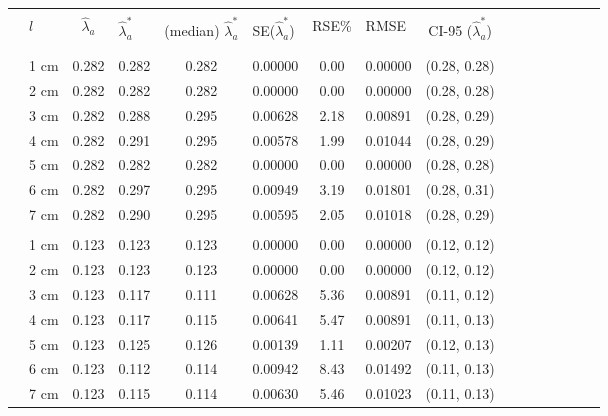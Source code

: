 \documentclass[a4paper 12pt]{article}
\numberwithin{equation}{section}
\begin{document}
\clearpage
 \begin{small}
\begin{table}[h!]
\centering
\setlength\tabcolsep{10.5pt} 
\begin{footnotesize}
\begin{tabular}{clclclclclclclcl}
  \hline \\ [0.3ex]
&  $l$ & $\hat{\lambda}_{a}$  & $\hat{\lambda}_{a}^{*}$ & (median) $\hat{\lambda}_{a}^{*}$  & SE($\hat{\lambda}_{a}^{*}$) & RSE\%& RMSE &  CI-95 ($\hat{\lambda}_{a}^{*}$) \\ [1.0ex]
\hline \\
 \raisebox{1ex}{\bf age 0}  \\ [1.0ex]
&   1 cm & 0.282  &    0.282 &  0.282 &  0.00000 & 0.00 & 0.00000 & (0.28, 0.28)\\
&   2 cm & 0.282  &    0.282 &  0.282 &  0.00000 & 0.00 & 0.00000 & (0.28, 0.28)\\
&   3 cm & 0.282  &    0.288 &  0.295 &  0.00628 & 2.18 & 0.00891 & (0.28, 0.29)\\
&   4 cm & 0.282  &    0.291 &  0.295 &  0.00578 & 1.99 & 0.01044 & (0.28, 0.29)\\
&   5 cm & 0.282  &    0.282 &  0.282 &  0.00000 & 0.00 & 0.00000 & (0.28, 0.28)\\
&   6 cm & 0.282  &    0.297 &  0.295 &  0.00949 & 3.19 & 0.01801 & (0.28, 0.31)\\
&   7 cm & 0.282  &    0.290 &  0.295 &  0.00595 & 2.05 & 0.01018 & (0.28, 0.29)\\[1.2ex]

 \raisebox{1ex}{\bf age 1}&  \\ [1.0ex]
&   1 cm & 0.123 &      0.123  & 0.123 & 0.00000  & 0.00 & 0.00000 & (0.12, 0.12)\\
&   2 cm & 0.123 &      0.123  & 0.123 & 0.00000  & 0.00 & 0.00000 & (0.12, 0.12)\\
&   3 cm & 0.123 &      0.117  & 0.111 & 0.00628  & 5.36 & 0.00891 & (0.11, 0.12)\\
&   4 cm & 0.123 &      0.117  & 0.115 & 0.00641  & 5.47 & 0.00891 & (0.11, 0.13) \\
&   5 cm & 0.123 &      0.125  & 0.126 & 0.00139  & 1.11 & 0.00207 & (0.12, 0.13) \\
&   6 cm & 0.123 &      0.112  & 0.114 & 0.00942  & 8.43 & 0.01492 & (0.11, 0.13)\\
&   7 cm & 0.123 &      0.115  & 0.114 & 0.00630  & 5.46 & 0.01023 & (0.11, 0.13)\\[1.2ex]


\end{tabular}
\end{footnotesize}
\end{table}
\end{small}
\end{document}
